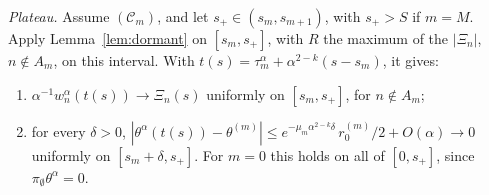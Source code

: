 \documentclass[11pt]{article}
\theoremstyle{definition}
\theoremstyle{remark}
\begin{document}
\emph{Plateau.} Assume $(\mathcal C_m)$, and let $s_+\in(s_m,s_{m+1})$, with $s_+>S$ if $m=M$. Apply Lemma~\ref{lem:dormant} on $[s_m,s_+]$, with $R$ the maximum of the $|\Xi_n|$, $n\notin A_m$, on this interval. With $t(s)=\tau^\alpha_m+\alpha^{2-k}(s-s_m)$, it gives:
\begin{enumerate}[label=(P\arabic*),leftmargin=3em,nosep]
\item $\alpha^{-1}w^\alpha_n(t(s))\to\Xi_n(s)$ uniformly on $[s_m,s_+]$, for $n\notin A_m$;
\item for every $\delta>0$, $|\theta^\alpha(t(s))-\theta^{(m)}|\le e^{-\mu_m\alpha^{2-k}\delta}\,r^{(m)}_0/2+O(\alpha)\to0$ uniformly on $[s_m+\delta,s_+]$. For $m=0$ this holds on all of $[0,s_+]$, since $\pi_\emptyset\theta^\alpha=0$.
\end{enumerate}
\end{document}
